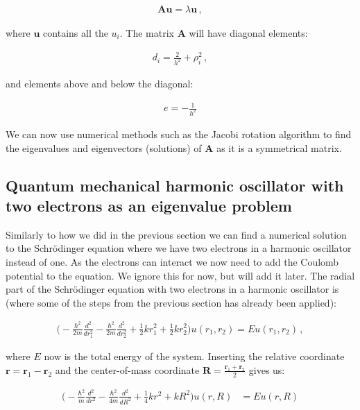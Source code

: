\documentclass[reprint,english,notitlepage]{revtex4-1}  %
\begin{document}
\begin{align*}
\textbf{Au} = \lambda \textbf{u} \, ,
\end{align*}

where $\textbf{u}$ contains all the $u_i$. The matrix \textbf{A} will have diagonal elements:

\begin{align*}
d_i = \frac{2}{h^2} + \rho_i^2 \, ,
\end{align*}

and elements above and below the diagonal:

\begin{align*}
e = -\frac{1}{h^2}
\end{align*}

We can now use numerical methods such as the Jacobi rotation algorithm to find the eigenvalues and eigenvectors (solutions) of \textbf{A} as it is a symmetrical matrix.


\subsection{Quantum mechanical harmonic oscillator with two electrons as an eigenvalue problem} \label{sec:II:e}
 
Similarly to how we did in the previous section we can find a numerical solution to the Schrödinger equation where we have two electrons in a harmonic oscillator instead of one. As the electrons can interact we now need to add the Coulomb potential to the equation. We ignore this for now, but will add it later. The radial part of the Schrödinger equation with two electrons in a harmonic oscillator is (where some of the steps from the previous section has already been applied):

\begin{align*}
\bigg( -\frac{\hbar^2}{2m} \frac{d^2}{dr_1^2} - \frac{\hbar^2}{2m} \frac{d^2}{dr_2^2} + \frac{1}{2}kr_1^2 + \frac{1}{2}kr_2^2 \bigg) u(r_1,r_2) =  Eu(r_1,r_2) \, ,
\end{align*}

where $E$ now is the total energy of the system. Inserting the relative coordinate $\textbf{r} = \textbf{r}_1 - \textbf{r}_2$ and the center-of-mass coordinate $\textbf{R} = \frac{\textbf{r}_1 + \textbf{r}_2}{2}$ gives us:

\begin{align*}
\bigg( -\frac{\hbar^2}{m} \frac{d^2}{dr^2} - \frac{\hbar^2}{4m} \frac{d^2}{dR^2} + \frac{1}{4}kr^2 + kR^2\bigg) u(r,R) &= Eu(r,R)
\end{align*}
\end{document}
